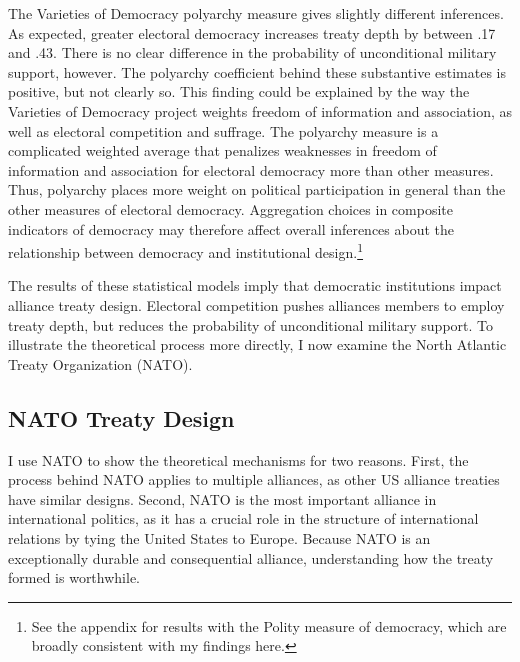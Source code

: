 \documentclass[12pt]{article}
\begin{document}
The Varieties of Democracy polyarchy measure gives slightly different inferences. 
As expected, greater electoral democracy increases treaty depth by between .17 and .43. 
There is no clear difference in the probability of unconditional military support, however.
The polyarchy coefficient behind these substantive estimates is positive, but not clearly so.  
This finding could be explained by the way the Varieties of Democracy project weights freedom of information and association, as well as electoral competition and suffrage. 
The polyarchy measure is a complicated weighted average that penalizes weaknesses in freedom of information and association for electoral democracy more than other measures.
Thus, polyarchy places more weight on political participation in general than the other measures of electoral democracy. 
Aggregation choices in composite indicators of democracy may therefore affect overall inferences about the relationship between democracy and institutional design.\footnote{See the appendix for results with the Polity measure of democracy, which are broadly consistent with my findings here.}



The results of these statistical models imply that democratic institutions impact alliance treaty design. 
Electoral competition pushes alliances members to employ treaty depth, but reduces the probability of unconditional military support.  
To illustrate the theoretical process more directly, I now examine the North Atlantic Treaty Organization (NATO).


\subsection{NATO Treaty Design}


I use NATO to show the theoretical mechanisms for two reasons. 
First, the process behind NATO applies to multiple alliances, as other US alliance treaties have similar designs. 
Second, NATO is the most important alliance in international politics, as it has a crucial role in the structure of international relations by tying the United States to Europe. 
Because NATO is an exceptionally durable and consequential alliance, understanding how the treaty formed is worthwhile. 
\end{document}
